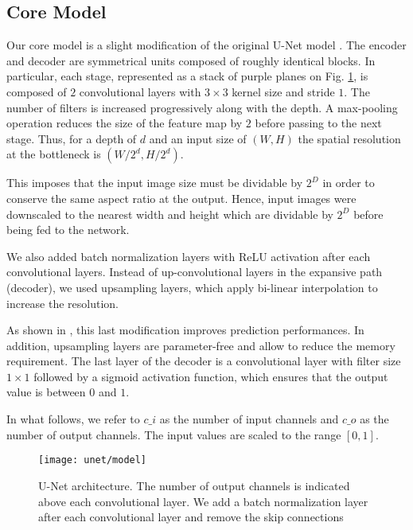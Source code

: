 \subsection{Core Model} \label{model}
Our core model is a slight modification of the original U-Net model \cite{ronneberger15}.
The encoder and decoder are symmetrical units composed of roughly identical blocks.
In particular, each stage, represented as a stack of purple planes on Fig. \ref{fig:unet_model}, is composed of $2$ convolutional layers with $3 \times 3$ kernel size and stride $1$.
The number of filters is increased progressively along with the depth.
A max-pooling operation reduces the size of the feature map by $2$ before passing to the next stage.
Thus, for a depth of $d$ and an input size of $(W, H)$ the spatial resolution at the bottleneck is  $(W /2^d, H/2^{d})$.

This imposes that the input image size must be dividable by $2^{D}$ in order to conserve the same aspect ratio at the output.
Hence, input images were downscaled to the nearest width and height which are dividable by $2^{D}$ before being fed to the network.

We also added batch normalization layers with ReLU activation after each convolutional layers.
Instead of up-convolutional layers in the expansive path (decoder), we used upsampling layers, which apply bi-linear interpolation to increase the resolution.

As shown in \cite{vorontsov17}, this last modification improves prediction performances.
In addition, upsampling layers are parameter-free and allow to reduce the memory requirement.
The last layer of the decoder is a convolutional layer with filter size $1 \times 1$ followed by a sigmoid activation function, which ensures that the output value is between $0$ and $1$.

In what follows, we refer to $c\_i$ as the number of input channels and $c\_o$ as the number of output channels.
The input values are scaled to the range $[0,1]$.

\clearpage
\begin{figure}[!htbp]
  \centering
  \texttt{[image: unet/model]}
  \caption[Modified U-Net architecture]{U-Net architecture.
    The number of output channels is indicated above each convolutional layer.
    We add a batch normalization layer after each convolutional layer and remove the skip connections}
  \label{fig:unet_model}
\end{figure}

